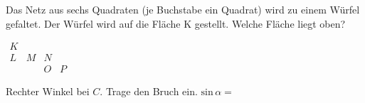 \documentclass[11pt]{article}
\begin{document}
\begin{aufgabe}{\begin{minipage}[t]{0.6\linewidth}Das Netz aus sechs Quadraten (je Buchstabe ein Quadrat) wird zu einem Würfel gefaltet. Der Würfel wird auf die Fläche K gestellt. Welche Fläche liegt oben? \leerfeld\end{minipage}\hfill\begin{minipage}[t]{0.37\linewidth}\vspace{0pt}
$\begin{array}{cccc} K &  &  &  \\ L & M & N &  \\  &  & O & P \end{array}$
\end{minipage}}
\end{aufgabe}

\begin{aufgabe}{\begin{minipage}[t]{0.6\linewidth}Rechter Winkel bei $C$. Trage den Bruch ein. $\mathrm{sin}\,\alpha =$ \leerfeld\end{minipage}\hfill\begin{minipage}[t]{0.37\linewidth}\vspace{0pt}
\end{minipage}}
\end{aufgabe}
\end{document}
